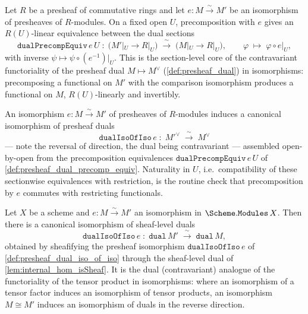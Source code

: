 \begin{definition}\leanok
  \label{def:presheaf_dual_precomp_equiv}
  Let \(R\) be a presheaf of commutative rings and let \(e : M \xrightarrow{\sim} M'\)
  be an isomorphism of presheaves of \(R\)-modules. On a fixed open \(U\), precomposition
  with \(e\) gives an \(R(U)\)-linear equivalence between the dual sections
  \[
    \mathtt{dualPrecompEquiv}\,e\,U \;\colon\;
      \bigl(M'|_U \to R|_U\bigr) \;\xrightarrow{\ \sim\ }\; \bigl(M|_U \to R|_U\bigr),
      \qquad \varphi \;\longmapsto\; \varphi \circ e|_U,
  \]
  with inverse \(\psi \mapsto \psi \circ (e^{-1})|_U\). This is the section-level core of
  the contravariant functoriality of the presheaf dual \(M \mapsto M^\vee\)
  (\cref{def:presheaf_dual}) in isomorphisms: precomposing a functional on \(M'\) with
  the comparison isomorphism produces a functional on \(M\), \(R(U)\)-linearly and
  invertibly.
\end{definition}

\begin{definition}\leanok
  \label{def:presheaf_dual_iso_of_iso}
  An isomorphism \(e : M \xrightarrow{\sim} M'\) of presheaves of \(R\)-modules induces a
  canonical isomorphism of presheaf duals
  \[
    \mathtt{dualIsoOfIso}\,e \;\colon\; M'^\vee \;\xrightarrow{\ \sim\ }\; M^\vee
  \]
  --- note the reversal of direction, the dual being contravariant --- assembled
  open-by-open from the precomposition equivalences
  \(\mathtt{dualPrecompEquiv}\,e\,U\) of \cref{def:presheaf_dual_precomp_equiv}.
  Naturality in \(U\), i.e.\ compatibility of these sectionwise equivalences with
  restriction, is the routine check that precomposition by \(e\) commutes with
  restricting functionals.
\end{definition}

\begin{definition}\leanok
  \label{def:scheme_modules_dual_iso_of_iso}
  Let \(X\) be a scheme and \(e : M \xrightarrow{\sim} M'\) an isomorphism in
  \(\Scheme.\mathtt{Modules}\,X\). Then there is a canonical isomorphism of sheaf-level
  duals
  \[
    \mathtt{dualIsoOfIso}\,e \;\colon\; \mathtt{dual}\,M' \;\xrightarrow{\ \sim\ }\;
      \mathtt{dual}\,M,
  \]
  obtained by sheafifying the presheaf isomorphism \(\mathtt{dualIsoOfIso}\,e\) of
  \cref{def:presheaf_dual_iso_of_iso} through the sheaf-level dual of
  \cref{lem:internal_hom_isSheaf}. It is the dual (contravariant) analogue of the
  functoriality of the tensor product in isomorphisms: where an isomorphism of a tensor
  factor induces an isomorphism of tensor products, an isomorphism \(M \cong M'\)
  induces an isomorphism of duals in the reverse direction.
\end{definition}

